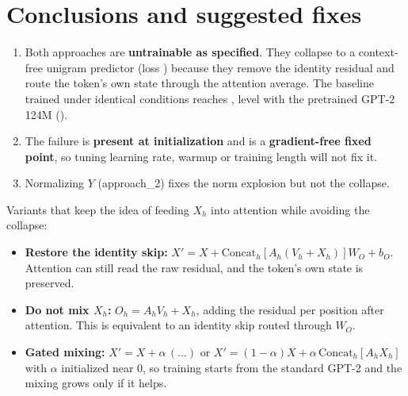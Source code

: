\documentclass[11pt]{article}
\begin{document}
\section{Conclusions and suggested fixes}
\begin{enumerate}
\item Both approaches are \textbf{untrainable as specified}. They collapse to a context-free unigram
predictor (loss \UniCE) because they remove the identity residual and route the token's own state
through the attention average. The baseline trained under identical conditions reaches \BaseFinal,
level with the pretrained GPT-2 124M (\RefLoss).
\item The failure is \textbf{present at initialization} and is a \textbf{gradient-free fixed point}, so
tuning learning rate, warmup or training length will not fix it.
\item Normalizing $Y$ (approach\_2) fixes the norm explosion but not the collapse.
\end{enumerate}
Variants that keep the idea of feeding $X_h$ into attention while avoiding the collapse:
\begin{itemize}
\item \textbf{Restore the identity skip:} $X' = X + \mathrm{Concat}_h[A_h(V_h+X_h)]W_O + b_O$. Attention can still
read the raw residual, and the token's own state is preserved.
\item \textbf{Do not mix $X_h$:} $O_h = A_h V_h + X_h$, adding the residual per position after
attention. This is equivalent to an identity skip routed through $W_O$.
\item \textbf{Gated mixing:} $X' = X + \alpha\,(\ldots)$ or $X' = (1-\alpha)X + \alpha\,\mathrm{Concat}_h[A_h X_h]$
with $\alpha$ initialized near 0, so training starts from the standard GPT-2 and the
mixing grows only if it helps.
\end{itemize}
\end{document}
